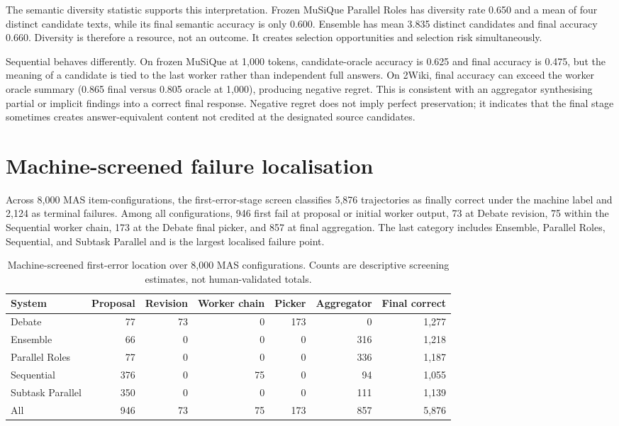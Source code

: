 The semantic diversity statistic supports this interpretation. Frozen MuSiQue Parallel Roles has diversity rate 0.650 and a mean of four distinct candidate texts, while its final semantic accuracy is only 0.600. Ensemble has mean 3.835 distinct candidates and final accuracy 0.660. Diversity is therefore a resource, not an outcome. It creates selection opportunities and selection risk simultaneously.

Sequential behaves differently. On frozen MuSiQue at 1,000 tokens, candidate-oracle accuracy is 0.625 and final accuracy is 0.475, but the meaning of a candidate is tied to the last worker rather than independent full answers. On 2Wiki, final accuracy can exceed the worker oracle summary (0.865 final versus 0.805 oracle at 1,000), producing negative regret. This is consistent with an aggregator synthesising partial or implicit findings into a correct final response. Negative regret does not imply perfect preservation; it indicates that the final stage sometimes creates answer-equivalent content not credited at the designated source candidates.

\section{Machine-screened failure localisation}

Across 8,000 MAS item-configurations, the first-error-stage screen classifies 5,876 trajectories as finally correct under the machine label and 2,124 as terminal failures. Among all configurations, 946 first fail at proposal or initial worker output, 73 at Debate revision, 75 within the Sequential worker chain, 173 at the Debate final picker, and 857 at final aggregation. The last category includes Ensemble, Parallel Roles, Sequential, and Subtask Parallel and is the largest localised failure point.

\begin{table}[htbp]
  \centering
  \caption[Machine-screened first-error locations]{Machine-screened first-error location over 8,000 MAS configurations. Counts are descriptive screening estimates, not human-validated totals.}
  \label{tab:first-error}
  \small
  \setlength{\tabcolsep}{4pt}
  \begin{tabular}{@{}lrrrrrr@{}}
    \toprule
    System & Proposal & Revision & Worker chain & Picker & Aggregator & Final correct \\
    \midrule
    Debate & 77 & 73 & 0 & 173 & 0 & 1,277 \\
    Ensemble & 66 & 0 & 0 & 0 & 316 & 1,218 \\
    Parallel Roles & 77 & 0 & 0 & 0 & 336 & 1,187 \\
    Sequential & 376 & 0 & 75 & 0 & 94 & 1,055 \\
    Subtask Parallel & 350 & 0 & 0 & 0 & 111 & 1,139 \\
    \midrule
    All & 946 & 73 & 75 & 173 & 857 & 5,876 \\
    \bottomrule
  \end{tabular}
\end{table}

